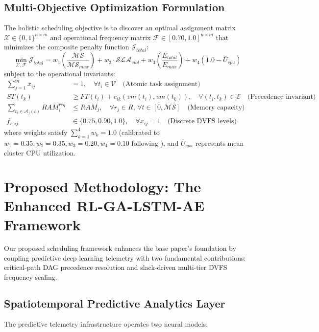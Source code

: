 \documentclass[default,sn-mathphys-num]{sn-jnl}
\theoremstyle{thmstyleone}
\theoremstyle{thmstyletwo}
\theoremstyle{thmstylethree}
\begin{document}
\subsection{Multi-Objective Optimization Formulation}
The holistic scheduling objective is to discover an optimal assignment matrix $\mathcal{X} \in \{0, 1\}^{n \times m}$ and operational frequency matrix $\mathcal{F} \in [0.70, 1.0]^{n \times m}$ that minimizes the composite penalty function $\mathcal{J}_{total}$:
\begin{equation}\label{eq:objective}
\min_{\mathcal{X}, \mathcal{F}} \mathcal{J}_{total} = w_1 \left( \frac{\mathcal{MS}}{\mathcal{MS}_{max}} \right) + w_2 \cdot \mathcal{SLA}_{viol} + w_3 \left( \frac{E_{total}}{E_{max}} \right) + w_4 \left( 1.0 - \overline{U}_{cpu} \right)
\end{equation}
subject to the operational invariants:
\begin{align}
\sum_{j=1}^m x_{ij} &= 1, \quad \forall t_i \in \mathcal{V} \quad \text{(Atomic task assignment)} \label{eq:const1} \\
ST(t_k) &\ge FT(t_i) + c_{ik}(vm(t_i), vm(t_k)), \quad \forall (t_i, t_k) \in \mathcal{E} \quad \text{(Precedence invariant)} \label{eq:const2} \\
\sum_{t_i \in \mathcal{A}_j(t)} RAM_i^{req} &\le RAM_j, \quad \forall r_j \in R, \, \forall t \in [0, \mathcal{MS}] \quad \text{(Memory capacity)} \label{eq:const3} \\
f_{r, ij} &\in \{0.75, 0.90, 1.0\}, \quad \forall x_{ij} = 1 \quad \text{(Discrete DVFS levels)} \label{eq:const4}
\end{align}
where weights satisfy $\sum_{k=1}^4 w_k = 1.0$ (calibrated to $w_1 = 0.35, w_2 = 0.35, w_3 = 0.20, w_4 = 0.10$ following \cite{narsimhulu2026hybrid}), and $\overline{U}_{cpu}$ represents mean cluster CPU utilization.

\section{Proposed Methodology: The Enhanced RL-GA-LSTM-AE Framework}\label{sec:methodology}

Our proposed scheduling framework enhances the base paper's foundation by coupling predictive deep learning telemetry with two fundamental contributions: critical-path DAG precedence resolution and slack-driven multi-tier DVFS frequency scaling.

\subsection{Spatiotemporal Predictive Analytics Layer}
The predictive telemetry infrastructure operates two neural models:
\end{document}
